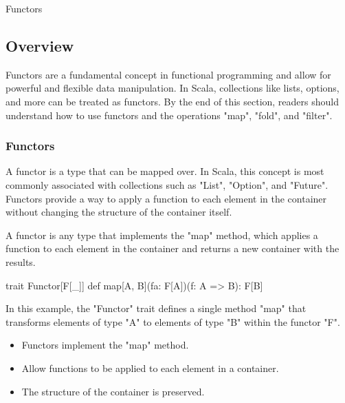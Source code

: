 \begin{notes}{Functors}
    \subsection*{Overview}

    Functors are a fundamental concept in functional programming and allow for powerful and flexible data manipulation. In Scala, collections like lists, options, and more can be treated as functors. 
    By the end of this section, readers should understand how to use functors and the operations "map", "fold", and "filter".
    
    \subsubsection*{Functors}
    
    A functor is a type that can be mapped over. In Scala, this concept is most commonly associated with collections such as "List", "Option", and "Future". Functors provide a way to apply a function 
    to each element in the container without changing the structure of the container itself.
    
    \begin{highlight}
    
        A functor is any type that implements the "map" method, which applies a function to each element in the container and returns a new container with the results.
    
    \begin{code}[Scala]
    trait Functor[F[_]] {
        def map[A, B](fa: F[A])(f: A => B): F[B]
    }
    \end{code}
    
        In this example, the "Functor" trait defines a single method "map" that transforms elements of type "A" to elements of type "B" within the functor "F".
        
        \begin{itemize}
            \item Functors implement the "map" method.
            \item Allow functions to be applied to each element in a container.
            \item The structure of the container is preserved.
        \end{itemize}
    
    \end{highlight}
    

\end{notes}
